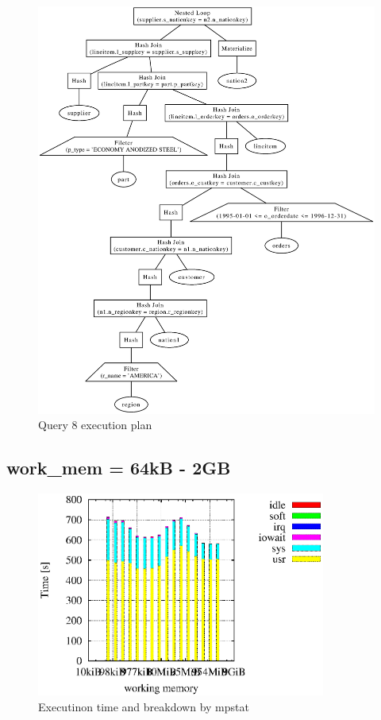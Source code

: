 \documentclass[11pt,a4paper]{jsarticle}
\begin{document}
\begin{figure}[thbp]
 \begin{center}
  \includegraphics[width=150mm]{query8.eps}
 \end{center}
 \caption{Query 8 execution plan}
 \label{fig:query8}
\end{figure}

\clearpage
\subsection{work\_mem = 64kB - 2GB}
\begin{figure}[thbp]
 \begin{center}
  \includegraphics[width=95mm]{q8cputime.eps}
 \end{center}
 \caption{Executinon time and breakdown by mpstat}
 \label{fig:q8cputime}
\end{figure}
\end{document}
